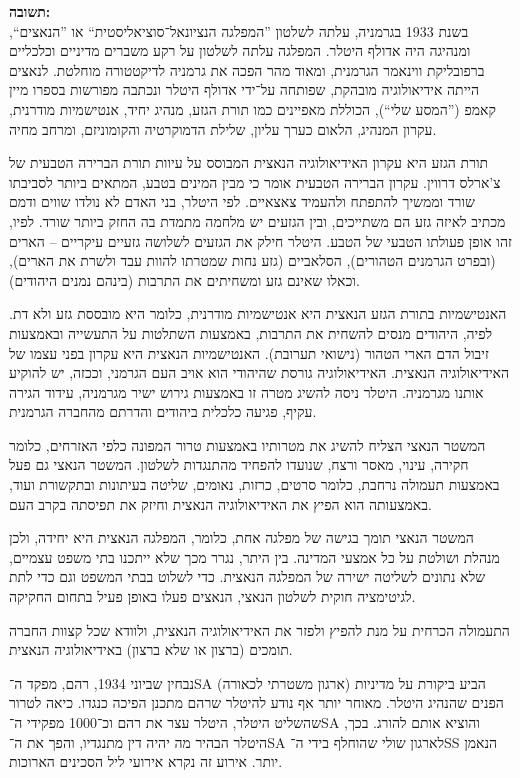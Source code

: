 \documentclass[a4paper]{article}
\newcommand\hl[1]   {#1}
\begin{document}
	\textbf{תשובה: }\\
	בשנת 1933 בגרמניה, עלתה לשלטון ''המפלגה הנציונאל־סוציאליסטית`` או ''הנאצים``, ומנהיגה היה \hl{אדולף היטלר}. המפלגה עלתה לשלטון על רקע משברים מדיניים וכלכליים ברפובליקת ווינאמר הגרמנית, ומאוד מהר הפכה את גרמניה לדיקטטורה מוחלטת. לנאצים הייתה \hl{אידיאולוגיה מובהקת}, שפותחה על־ידי אדולף היטלר ונכתבה מפורשות בספרו מיין קאמפ (''המסע שלי``), הכוללת מאפיינים כמו תורת הגזע, מנהיג יחיד, אנטישמיות מודרנית, עקרון המנהיג, הלאום כערך עליון, שלילת הדמוקרטיה והקומוניזם, ומרחב מחיה. 
	
	תורת הגזע היא עקרון האידיאולוגיה הנאצית המבוסס על עיוות תורת הברירה הטבעית של צ'ארלס דרווין. \hl{עקרון הברירה הטבעית} אומר כי מבין המינים בטבע, המתאים ביותר לסביבתו שורד וממשיך להתפתח ולהעמיד צאצאיים. לפי היטלר, בני האדם לא נולדו שווים ודמם מכתיב לאיזה גזע הם משתייכים, ובין הגזעים יש מלחמה מתמדת בה החזק ביותר שורד. לפיו, זהו אופן פעולתו הטבעי של הטבע. היטלר חילק את הגזעים לשלושה גזעיים עיקריים – ה\hl{ארים} (ובפרט הגרמנים הטהורים), הסלאביים (גזע נחות שמטרתו להוות עבד ולשרת את הארים), וכאלו שאינם גזע ומשחיתים את התרבות (בינהם נמנים היהודים). 
	
	ה\hl{אנטישמיות} בתורת הגזע הנאצית היא אנטישמיות מודרנית, כלומר היא מובססת גזע ולא דת. לפיה, היהודים מנסים להשחית את התרבות, באמצעות השתלטות על התעשייה ובאמצעות זיבול הדם הארי הטהור (נישואי תערובת). האנטישמיות הנאצית היא עקרון בפני עצמו של האידיאולוגיה הנאצית. האידיאולוגיה גורסת שהיהודי הוא אויב העם הגרמני, וככזה, יש להוקיע אותנו מגרמניה. היטלר ניסה להשיג מטרה זו באמצעות גירוש ישיר מגרמניה, עידוד הגירה עקיף, פגיעה כלכלית ביהודים והדרתם מהחברה הגרמנית. 
	
	המשטר הנאצי הצליח להשיג את מטרותיו באמצעות טרור המפונה כלפי האזרחים, כלומר חקירה, עינוי, מאסר ורצח, שנועדו להפחיד מהתנגדות לשלטון. המשטר הנאצי גם פעל באמצעות תעמולה נרחבת, כלומר סרטים, כרזות, נאומים, שליטה בעיתונות ובתקשורת ועוד, באמצעותה הוא הפיץ את האידיאולוגיה הנאצית וחיזק את תפיסתה בקרב העם. 
	
	המשטר הנאצי תומך בגישה של מפלגה אחת, כלומר, המפלגה הנאצית היא יחידה, ולכן מנהלת ושולטת על כל אמצעי המדינה. בין היתר, נגרר מכך שלא ייתכנו בתי משפט עצמיים, שלא נתונים לשליטה ישירה של המפלגה הנאצית. כדי לשלוט בבתי המשפט וגם כדי לתת לגיטימציה חוקית לשלטון הנאצי, הנאצים פעלו באופן פעיל בתחום החקיקה. 
	
	התעמולה הכרחית על מנת להפיץ ולפזר את האידיאולוגיה הנאצית, ולוודא שכל קצוות החברה תומכים (ברצון או שלא ברצון) באידיאולוגיה הנאצית. 
	
	נבחין שביוני 1934, רהם, מפקד ה־SA (ארגון משטרתי לכאורה) הביע ביקורת על מדיניות הפנים שהנהיג היטלר. מאוחר יותר אף נודע להיטלר שרהם מתכנן הפיכה כנגדו. כיאה לטרור שהשליט היטלר, היטלר עצר את רהם וכ־1000 מפקידי ה־SA  והוציא אותם להורג. בכך, היטלר הבהיר מה יהיה דין מתנגדיו, והפך את ה־SA לארגון שולי שהוחלף בידי ה־SS הנאמן יותר. אירוע זה נקרא \hl{אירועי ליל הסכינים הארוכות}. 
	
\end{document}
